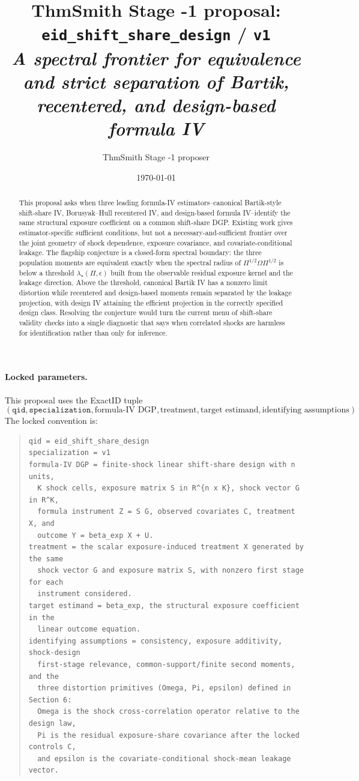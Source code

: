 \documentclass[11pt]{article}
\title{ThmSmith Stage -1 proposal: \texttt{eid\_shift\_share\_design} / \texttt{v1}%
  \\ \large\textit{A spectral frontier for equivalence and strict separation of Bartik, recentered, and design-based formula IV}}
\author{ThmSmith Stage -1 proposer}
\date{\today}
\theoremstyle{definition}
\theoremstyle{plain}
\theoremstyle{remark}
\begin{document}
\maketitle


\paragraph{Locked parameters.}
This proposal uses the ExactID tuple
\[
(\texttt{qid},\texttt{specialization},\text{formula-IV DGP},\text{treatment},
\text{target estimand},\text{identifying assumptions}).
\]
The locked convention is:
\begin{quote}
\begin{verbatim}
qid = eid_shift_share_design
specialization = v1
formula-IV DGP = finite-shock linear shift-share design with n units,
  K shock cells, exposure matrix S in R^{n x K}, shock vector G in R^K,
  formula instrument Z = S G, observed covariates C, treatment X, and
  outcome Y = beta_exp X + U.
treatment = the scalar exposure-induced treatment X generated by the same
  shock vector G and exposure matrix S, with nonzero first stage for each
  instrument considered.
target estimand = beta_exp, the structural exposure coefficient in the
  linear outcome equation.
identifying assumptions = consistency, exposure additivity, shock-design
  first-stage relevance, common-support/finite second moments, and the
  three distortion primitives (Omega, Pi, epsilon) defined in Section 6:
  Omega is the shock cross-correlation operator relative to the design law,
  Pi is the residual exposure-share covariance after the locked controls C,
  and epsilon is the covariate-conditional shock-mean leakage vector.
\end{verbatim}
\end{quote}

\begin{abstract}
This proposal asks when three leading formula-IV estimators--canonical Bartik-style shift-share IV, Borusyak--Hull recentered IV, and design-based formula IV--identify the same structural exposure coefficient on a common shift-share DGP.  Existing work gives estimator-specific sufficient conditions, but not a necessary-and-sufficient frontier over the joint geometry of shock dependence, exposure covariance, and covariate-conditional leakage.  The flagship conjecture is a closed-form spectral boundary: the three population moments are equivalent exactly when the spectral radius of $\Pi^{1/2}\Omega\Pi^{1/2}$ is below a threshold $\lambda_\star(\Pi,\epsilon)$ built from the observable residual exposure kernel and the leakage direction.  Above the threshold, canonical Bartik IV has a nonzero limit distortion while recentered and design-based moments remain separated by the leakage projection, with design IV attaining the efficient projection in the correctly specified design class.  Resolving the conjecture would turn the current menu of shift-share validity checks into a single diagnostic that says when correlated shocks are harmless for identification rather than only for inference.
\end{abstract}
\end{document}
